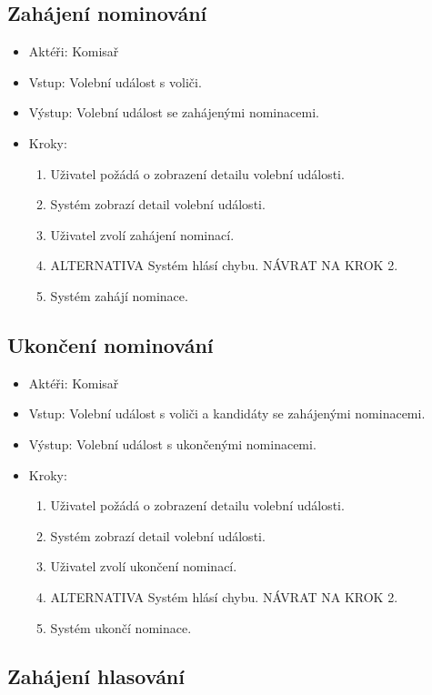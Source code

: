 \documentclass[11pt,twoside,a4paper]{book}
\begin{document}
\subsection{Zahájení nominování}

\begin{itemize}
\item Aktéři: Komisař
\item Vstup: Volební událost s voliči.
\item Výstup: Volební událost se zahájenými nominacemi.
\item Kroky:
	\begin{enumerate}
		\item Uživatel požádá o zobrazení detailu volební události.
		\item Systém zobrazí detail volební události.
		\item Uživatel zvolí zahájení nominací.		
		\item ALTERNATIVA Systém hlásí chybu. NÁVRAT NA KROK 2.
		\item Systém zahájí nominace.
	\end{enumerate}
\end{itemize}

\subsection{Ukončení nominování}

\begin{itemize}
\item Aktéři: Komisař
\item Vstup: Volební událost s voliči a kandidáty se zahájenými nominacemi.
\item Výstup: Volební událost s ukončenými nominacemi.
\item Kroky:
	\begin{enumerate}
		\item Uživatel požádá o zobrazení detailu volební události.
		\item Systém zobrazí detail volební události.
		\item Uživatel zvolí ukončení nominací.		
		\item ALTERNATIVA Systém hlásí chybu. NÁVRAT NA KROK 2.
		\item Systém ukončí nominace.
	\end{enumerate}
\end{itemize}

\subsection{Zahájení hlasování}
\end{document}
